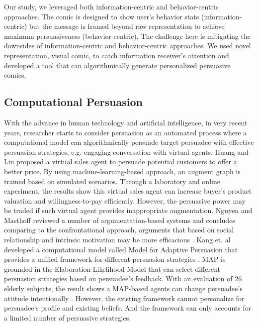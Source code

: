 Our study, we leveraged both information-centric and behavior-centric approaches. The comic is designed to show user's behavior stats (information-centric) but the message is framed beyond raw representation to achieve maximum persuasiveness (behavior-centric). The challenge here is mitigating the downsides of information-centric and behavior-centric approaches. We used novel representation, visual comic, to catch information receiver's attention and developed a tool that can algorithmically generate personalized persuasive comics.\par


\subsection{Computational Persuasion}
With the advance in human technology and artificial intelligence, in very recent years, researcher starts to consider persuasion as an automated process where a computational model can algorithmically persuade target persuadee with effective persuasion strategies, e.g. engaging conversation with virtual agents. Huang and Lin proposed a virtual sales agent to persuade potential customers to offer a better price. By using machine-learning-based approach, an augment graph is trained based on simulated scenarios. Through a laboratory and online experiment, the results show this virtual sales agent can increase buyer's product valuation and willingness-to-pay efficiently. However, the persuasive power may be traded if such virtual agent provides inappropriate augmentation. Nguyen and Masthoff reviewed a number of argumentation-based systems and concludes comparing to the confrontational approach, arguments that based on social relationship and intrinsic motivation may be more efficacious \cite{nguyen2008designing}. Kang et. al developed a computational model called Model for Adaptive Persuasion that provides a unified framework for different persuasion strategies \cite{kang2015adaptive}. MAP is grounded in the Elaboration Likelihood Model that can select different persuasion strategies based on persuadee's feedback. With an evaluation of 26 elderly subjects, the result shows a MAP-based agents can change persuadee's attitude intentionally \cite{kang2015adaptive}. However, the existing framework cannot personalize for persuadee's profile and existing beliefs. And the framework can only accounts for a limited number of persuasive strategies.\par
